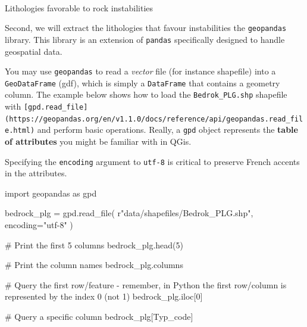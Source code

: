\documentclass[
  letterpaper,
  DIV=11,
  numbers=noendperiod]{scrartcl}
\makeatletter
\let\oldparagraph\paragraph
\renewcommand{\paragraph}{
    \@ifstar
      \xxxParagraphStar
      \xxxParagraphNoStar
  }
\newcommand{\xxxParagraphStar}[1]{\oldparagraph*{#1}\mbox{}}
\newcommand{\xxxParagraphNoStar}[1]{\oldparagraph{#1}\mbox{}}
\newenvironment{Shaded}{\begin{snugshade}}{\end{snugshade}}
\newcommand{\CommentTok}[1]{\textcolor[rgb]{0.37,0.37,0.37}{#1}}
\newcommand{\DecValTok}[1]{\textcolor[rgb]{0.68,0.00,0.00}{#1}}
\newcommand{\ImportTok}[1]{\textcolor[rgb]{0.00,0.46,0.62}{#1}}
\newcommand{\NormalTok}[1]{\textcolor[rgb]{0.00,0.23,0.31}{#1}}
\newcommand{\OperatorTok}[1]{\textcolor[rgb]{0.37,0.37,0.37}{#1}}
\newcommand{\StringTok}[1]{\textcolor[rgb]{0.13,0.47,0.30}{#1}}
\newcommand{\VerbatimStringTok}[1]{\textcolor[rgb]{0.13,0.47,0.30}{#1}}
\makeatother
\begin{document}
\paragraph{Lithologies favorable to rock
instabilities}\label{lithologies-favorable-to-rock-instabilities}

Second, we will extract the lithologies that favour instabilities the
\texttt{geopandas} library. This library is an extension of
\texttt{pandas} specifically designed to handle geospatial data.

You may use \texttt{geopandas} to read a \emph{vector} file (for
instance shapefile) into a \texttt{GeoDataFrame} (gdf), which is simply
a \texttt{DataFrame} that contains a geometry column. The example below
shows how to load the \texttt{Bedrok\_PLG.shp} shapefile with
\texttt{{[}gpd.read\_file{]}(https://geopandas.org/en/v1.1.0/docs/reference/api/geopandas.read\_file.html)}
and perform basic operations. Really, a \texttt{gpd} object represents
the \textbf{table of attributes} you might be familiar with in QGis.

\begin{tcolorbox}[enhanced jigsaw, arc=.35mm, left=2mm, toprule=.15mm, colbacktitle=quarto-callout-tip-color!10!white, toptitle=1mm, breakable, opacityback=0, rightrule=.15mm, title=\textcolor{quarto-callout-tip-color}{\faLightbulb}\hspace{0.5em}{Encoding}, colframe=quarto-callout-tip-color-frame, bottomrule=.15mm, colback=white, opacitybacktitle=0.6, bottomtitle=1mm, titlerule=0mm, coltitle=black, leftrule=.75mm]

Specifying the \texttt{encoding} argument to \texttt{utf-8} is critical
to preserve French accents in the attributes.

\end{tcolorbox}

\begin{Shaded}
\begin{Highlighting}[]
\ImportTok{import}\NormalTok{ geopandas }\ImportTok{as}\NormalTok{ gpd}

\NormalTok{bedrock\_plg }\OperatorTok{=}\NormalTok{ gpd.read\_file( }\VerbatimStringTok{r"data/shapefiles/Bedrok\_PLG}\DecValTok{.}\VerbatimStringTok{shp"}\NormalTok{, encoding}\OperatorTok{=}\StringTok{"utf{-}8"}
\NormalTok{)}

\CommentTok{\# Print the first 5 columns}
\NormalTok{bedrock\_plg.head(}\DecValTok{5}\NormalTok{)}

\CommentTok{\# Print the column names}
\NormalTok{bedrock\_plg.columns}

\CommentTok{\# Query the first row/feature {-} remember, in Python the first row/column is represented by the index 0 (not 1)}
\NormalTok{bedrock\_plg.iloc[}\DecValTok{0}\NormalTok{]}

\CommentTok{\# Query a specific column}
\NormalTok{bedrock\_plg[}\StringTok{\textquotesingle{}Typ\_code\textquotesingle{}}\NormalTok{]}
\end{Highlighting}
\end{Shaded}
\end{document}

